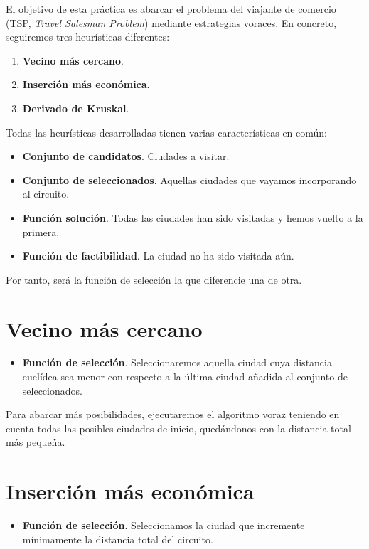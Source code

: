 \documentclass[12pt,spanish]{article}
\begin{document}
El objetivo de esta práctica es abarcar el problema del viajante de comercio (TSP, \textit{Travel Salesman Problem}) mediante estrategias voraces. En concreto, seguiremos tres heurísticas diferentes:

\begin{enumerate}
	\item \textbf{Vecino más cercano}.
	\item \textbf{Inserción más económica}.
	\item \textbf{Derivado de Kruskal}.
\end{enumerate}

Todas las heurísticas desarrolladas tienen varias características en común:
\begin{itemize}
	\item \textbf{Conjunto de candidatos}. Ciudades a visitar.
	\item \textbf{Conjunto de seleccionados}. Aquellas ciudades que vayamos incorporando al circuito.
	\item \textbf{Función solución}. Todas las ciudades han sido visitadas y hemos vuelto a la primera.
	\item \textbf{Función de factibilidad}. La ciudad no ha sido visitada aún.
\end{itemize}

Por tanto, será la función de selección la que diferencie una de otra.

\section{Vecino más cercano}

\begin{itemize}
	\item \textbf{Función de selección}. Seleccionaremos aquella ciudad cuya distancia euclídea sea menor con respecto a la última ciudad añadida al conjunto de seleccionados.
\end{itemize}

Para abarcar más posibilidades, ejecutaremos el algoritmo voraz teniendo en cuenta todas las posibles ciudades de inicio, quedándonos con la distancia total más pequeña.

\section{Inserción más económica}

\begin{itemize}
	\item \textbf{Función de selección}. Seleccionamos la ciudad que incremente mínimamente la distancia total del circuito.
\end{itemize}
\end{document}
